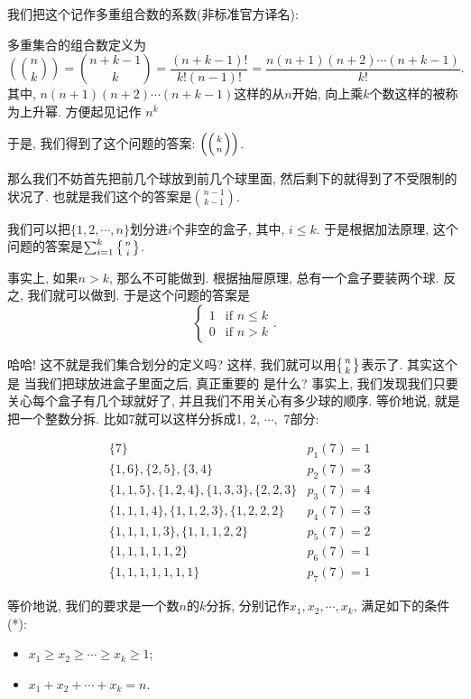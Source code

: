 我们把这个记作多重组合数的系数(非标准官方译名): 

\begin{definition}[多重集合组合数]
  多重集合的组合数定义为
  $$
  \left(\binom nk\right)=\binom{n+k-1}k=\frac{(n+k-1)!}{k!\left(n-1\right)!}=\frac{n(n+1)(n+2)\cdots(n+k-1)}{k!}.
  $$
  其中, $n(n+1)(n+2)\cdots(n+k-1)$这样的从$n$开始, 向上乘$k$个数这样的被称为上升幂. 方便起见记作
  $n^{\bar k}$
\end{definition}
于是, 我们得到了这个问题的答案: $\left(\left({k \atop n}\right)\right)$. 

 那么我们不妨首先把前几个球放到前几个球里面, 
然后剩下的就得到了不受限制的状况了. 也就是我们这个的答案是${n-1\choose k-1}. $

 我们可以把$\{1,2,\cdots,n\}$划分进$i$个非空的盒子, 
其中, $i\leq k$. 于是根据加法原理, 这个问题的答案是$\sum_{i=1}^{k}\left\{{n \atop i}\right\}$. 

 事实上, 如果$n>k$, 那么不可能做到.
根据抽屉原理, 总有一个盒子要装两个球. 反之, 我们就可以做到. 于是这个问题的答案是$$\begin{cases}1 & \text{if }n\leq k\\ 0& \text{if }n>k\end{cases}.$$

 哈哈! 这不就是我们集合划分的定义吗? 
这样, 我们就可以用$\left\{{n \atop k}\right\}$表示了.
 其实这个是
当我们把球放进盒子里面之后, 真正重要的
是什么? 事实上, 我们发现我们只要关心每个盒子有几个球就好了, 并且我们不用关心有多少球的顺序. 
等价地说, 就是把一个整数分拆. 比如7就可以这样分拆成1, 2, $\cdots,$ 7部分:

$$
\begin{aligned}
&\{7\}
& p_1(7)=1\\
&\{1,6\},\{2,5\},\{3,4\}
& p_2(7)=3\\
&\{1,1,5\}, \{1,2,4\}, \{1,3,3\}, \{2,2,3\} 
& p_3(7)=4\\
&\{1,1,1,4\},\{1,1,2,3\}, \{1,2,2,2\}
& p_4(7)=3\\
&\{1,1,1,1,3\},\{1,1,1,2,2\}
& p_5(7)=2\\
&\{1,1,1,1,1,2\}
& p_6(7)=1\\
&\{1,1,1,1,1,1,1\}
& p_7(7)=1
\end{aligned}
$$

等价地说, 我们的要求是一个数$n$的$k$分拆, 分别记作$x_1, x_2, \cdots, x_k$, 满足如下的条件(*): 
\begin{itemize}[noitemsep]
  \item  $x_1\ge x_2\ge\cdots\ge x_k\ge 1$;
  \item $x_1+x_2+\cdots+x_k=n$.
\end{itemize}

